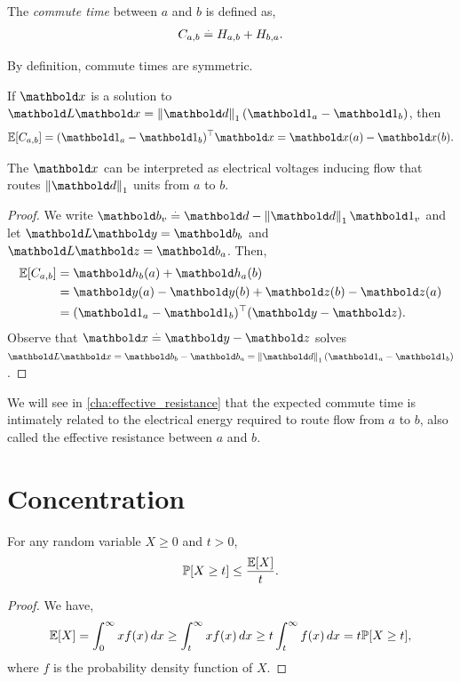 \begin{defn} The \emph{commute time} between $a$ and $b$ is defined as, \begin{align}
    C_{a,b} \overset{.}{=} H_{a,b} + H_{b,a}.
\end{align}
\end{defn}
\begin{rmk}
By definition, commute times are symmetric.
\end{rmk}

\begin{lem}
If $\vx$ is a solution to $\mL\vx = \norm{\vd}_1 (\vOne_a - \vOne_b)$, then \begin{align}
    \E{C_{a,b}} = \trans{(\vOne_a - \vOne_b)}\vx = \vx(a) - \vx(b).
\end{align}
\end{lem} The $\vx$ can be interpreted as electrical voltages inducing flow that routes $\norm{\vd}_1$ units from $a$ to $b$.
\begin{proof}
We write $\vb_v \defeq \vd - \norm{\vd}_1 \vOne_v$ and let $\mL\vy = \vb_b$ and $\mL\vz = \vb_a$. Then, \begin{align*}
    \E{C_{a,b}} &= \vh_b(a) + \vh_a(b) \\
    &= \vy(a) - \vy(b) + \vz(b) - \vz(a) \\
    &= \trans{(\vOne_a - \vOne_b)}(\vy - \vz).
\end{align*} Observe that $\vx \defeq \vy - \vz$ solves $\mL\vx = \vb_b - \vb_a = \norm{\vd}_1 (\vOne_a - \vOne_b)$.
\end{proof}

We will see in \cref{cha:effective_resistance} that the expected commute time is intimately related to the electrical energy required to route flow from $a$ to $b$, also called the effective resistance between $a$ and $b$.

\section{Concentration}

\begin{thm}
For any random variable $X \geq 0$ and $t > 0$, \begin{align}
    \Pr{X \geq t} \leq \frac{\E{X}}{t}.
\end{align}
\end{thm}
\begin{proof} We have, \begin{align*}
    \E{X} = \int_0^\infty x f(x) \,dx \geq \int_t^\infty x f(x) \, dx \geq t \int_t^\infty f(x) \,dx = t \Pr{X \geq t},
\end{align*} where $f$ is the probability density function of $X$.
\end{proof}

